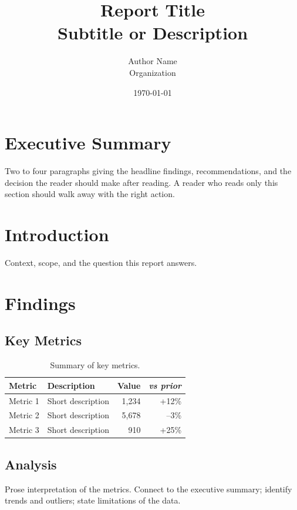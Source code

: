 \documentclass[11pt,a4paper]{article}
\title{\textbf{Report Title} \\ \large Subtitle or Description}
\author{Author Name \\ Organization}
\date{\today}
\begin{document}
\maketitle
\thispagestyle{empty}

\tableofcontents
\newpage

\section{Executive Summary}

Two to four paragraphs giving the headline findings, recommendations, and the decision the reader should make after reading. A reader who reads only this section should walk away with the right action.

\section{Introduction}

Context, scope, and the question this report answers.

\section{Findings}

\subsection{Key Metrics}

\begin{table}[htbp]
\centering
\caption{Summary of key metrics.}
\label{tab:metrics}
\begin{tabularx}{0.95\textwidth}{lXrr}
\toprule
\textbf{Metric} & \textbf{Description} & \textbf{Value} & \textbf{\textit{vs prior}} \\
\midrule
Metric 1 & Short description & 1{,}234 & +12\% \\
Metric 2 & Short description & 5{,}678 & --3\% \\
Metric 3 & Short description & 910 & +25\% \\
\bottomrule
\end{tabularx}
\end{table}

\subsection{Analysis}

Prose interpretation of the metrics. Connect to the executive summary; identify trends and outliers; state limitations of the data.
\end{document}
